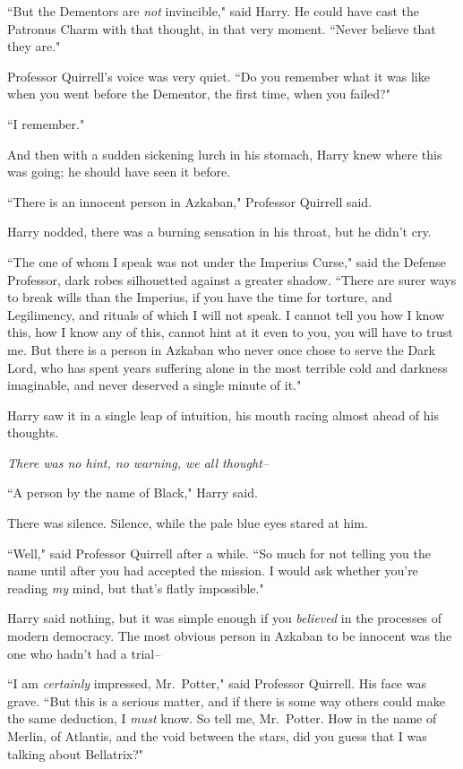 ``But the Dementors are \emph{not} invincible," said Harry. He could have cast the Patronus Charm with that thought, in that very moment. ``Never believe that they are."

Professor Quirrell's voice was very quiet. ``Do you remember what it was like when you went before the Dementor, the first time, when you failed?"

``I remember."

And then with a sudden sickening lurch in his stomach, Harry knew where this was going; he should have seen it before.

``There is an innocent person in Azkaban," Professor Quirrell said.

Harry nodded, there was a burning sensation in his throat, but he didn't cry.

``The one of whom I speak was not under the Imperius Curse," said the Defense Professor, dark robes silhouetted against a greater shadow. ``There are surer ways to break wills than the Imperius, if you have the time for torture, and Legilimency, and rituals of which I will not speak. I cannot tell you how I know this, how I know any of this, cannot hint at it even to you, you will have to trust me. But there is a person in Azkaban who never once chose to serve the Dark Lord, who has spent years suffering alone in the most terrible cold and darkness imaginable, and never deserved a single minute of it."

Harry saw it in a single leap of intuition, his mouth racing almost ahead of his thoughts.

\emph{There was no hint, no warning, we all thought\---}

``A person by the name of Black," Harry said.

There was silence. Silence, while the pale blue eyes stared at him.

``Well," said Professor Quirrell after a while. ``So much for not telling you the name until after you had accepted the mission. I would ask whether you're reading \emph{my} mind, but that's flatly impossible."

Harry said nothing, but it was simple enough if you \emph{believed} in the processes of modern democracy. The most obvious person in Azkaban to be innocent was the one who hadn't had a trial\---

``I am \emph{certainly} impressed, Mr.~Potter," said Professor Quirrell. His face was grave. ``But this is a serious matter, and if there is some way others could make the same deduction, I \emph{must} know. So tell me, Mr.~Potter. How in the name of Merlin, of Atlantis, and the void between the stars, did you guess that I was talking about Bellatrix?"

